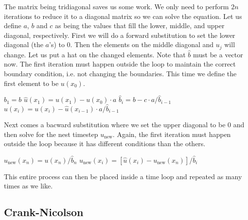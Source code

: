 The matrix being tridiagonal saves us some work. We only need to perform $2n$ 
iterations to reduce it to a diagonal matrix so we can solve the equation. Let 
us define $a$, $b$ and $c$ as being the values that fill the lower, middle, and 
upper diagonal, respectively. First we will do a forward substitution to set 
the lower diagonal (the $a$'s) to $0$. Then the elements on the middle diagonal 
and $u_j$ will change. Let us put a hat on the changed elements. Note that 
$\hat{b}$ must be a vector now. The first iteration must happen outside the loop
to maintain the correct boundary condition, i.e. not changing the boundaries. 
This time we define the first element to be $u(x_0)$.
\begin{algorithmic}
    \State $ \hat{b}_1 = b $
    \State $ \hat{u}(x_1) = u(x_1) - u(x_0) \cdot a $
        \State $ \hat{b}_i
                 = b    - c \cdot a / \hat{b}_{i-1} $
        \State $ \hat{u}(x_i)
                 = u(x_i) - \hat{u}(x_{i-1}) \cdot a / \hat{b}_{i-1} $
    \EndFor
\end{algorithmic}
Next comes a bacward substitution where we set the upper diagonal to be $0$ and 
then solve for the nest timestep $u_\textrm{new}$. Again, the first iteration
must happen outside the loop because it has different conditions than the 
others.
\begin{algorithmic}
    \State $ u_\textrm{new}(x_n) = u(x_n) / \hat{b}_n $
        \State $ u_\textrm{new}(x_i)
                 = \left[
                   \hat{u}(x_i) - u_\textrm{new}(x_n)
                   \right] / \hat{b}_i $
    \EndFor
\end{algorithmic}
This entire process can then be placed inside a time loop and repeated as many 
times as we like.



\subsection{Crank-Nicolson}

